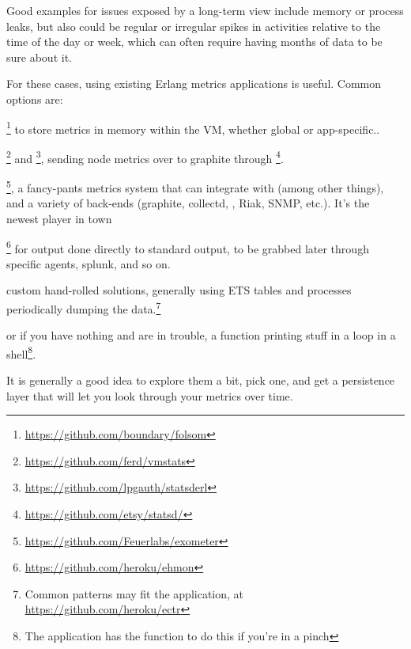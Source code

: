 \documentclass[11pt, oneside]{book}   	%
\begin{document}
Good examples for issues exposed by a long-term view include memory or process leaks, but also could be regular or irregular spikes in activities relative to the time of the day or week, which can often require having months of data to be sure about it.

For these cases, using existing Erlang metrics applications is useful. Common options are:

\begin{itemize*}
	\item {}\footnote{\href{https://github.com/boundary/folsom}{https://github.com/boundary/folsom}} to store metrics in memory within the VM, whether global or app-specific..
	\item {}\footnote{\href{https://github.com/ferd/vmstats}{https://github.com/ferd/vmstats}} and \footnote{\href{https://github.com/lpgauth/statsderl}{https://github.com/lpgauth/statsderl}}, sending node metrics over to graphite through \footnote{\href{https://github.com/etsy/statsd/}{https://github.com/etsy/statsd/}}.
	\item {}\footnote{\href{https://github.com/Feuerlabs/exometer}{https://github.com/Feuerlabs/exometer}}, a fancy-pants metrics system that can integrate with  (among other things),  and a variety of back-ends (graphite, collectd, , Riak, SNMP, etc.). It's the newest player in town
	\item {}\footnote{\href{https://github.com/heroku/ehmon}{https://github.com/heroku/ehmon}} for output done directly to standard output, to be grabbed later through specific agents, splunk, and so on.
	\item custom hand-rolled solutions, generally using ETS tables and processes periodically dumping the data.\footnote{Common patterns may fit the  application, at \href{https://github.com/heroku/ectr}{https://github.com/heroku/ectr}}
	\item or if you have nothing and are in trouble, a function printing stuff in a loop in a shell\footnote{The  application has the function  to do this if you're in a pinch}.
\end{itemize*}

It is generally a good idea to explore them a bit, pick one, and get a persistence layer that will let you look through your metrics over time.
\end{document}
